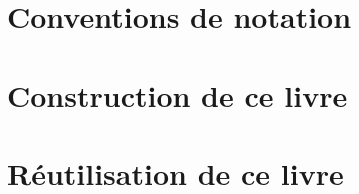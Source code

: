 		

	\section{Conventions de notation}
	\label{ch_conventions_notation}
		
		

	\section{Construction de ce livre}
	\label{ch_makingof}

		

	\section{Réutilisation de ce livre}
	\label{ch_remix}

		

	\clearpage\restoredefaultfootoffset%
	\restoregeometry%
	\restoredefaultsectionstyle%

